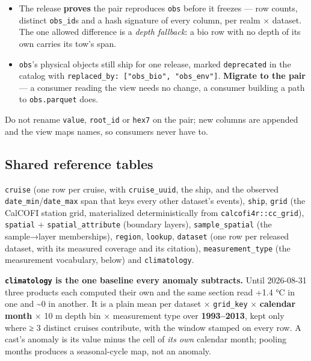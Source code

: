 \documentclass[
  letterpaper,
  DIV=11,
  numbers=noendperiod]{scrreprt}
\providecommand{\tightlist}{%
  \setlength{\itemsep}{0pt}\setlength{\parskip}{0pt}}
\begin{document}
\begin{itemize}
\tightlist
\item
  The release \textbf{proves} the pair reproduces \texttt{obs} before it
  freezes --- row counts, distinct \texttt{obs\_id}s and a hash
  signature of every column, per realm × dataset. The one allowed
  difference is a \emph{depth fallback}: a bio row with no depth of its
  own carries its tow's span.
\item
  \texttt{obs}'s physical objects still ship for one release, marked
  \texttt{deprecated} in the catalog with
  \texttt{replaced\_by:\ {[}"obs\_bio",\ "obs\_env"{]}}. \textbf{Migrate
  to the pair} --- a consumer reading the view needs no change, a
  consumer building a path to \texttt{obs.parquet} does.
\end{itemize}

Do not rename \texttt{value}, \texttt{root\_id} or \texttt{hex7} on the
pair; new columns are appended and the view maps names, so consumers
never have to.

\subsection{Shared reference tables}\label{shared-reference-tables}

\texttt{cruise} (one row per cruise, with \texttt{cruise\_uuid}, the
ship, and the observed \texttt{date\_min}/\texttt{date\_max} span that
keys every other dataset's events), \texttt{ship}, \texttt{grid} (the
CalCOFI station grid, materialized deterministically from
\texttt{calcofi4r::cc\_grid}), \texttt{spatial} +
\texttt{spatial\_attribute} (boundary layers), \texttt{sample\_spatial}
(the sample→layer memberships), \texttt{region}, \texttt{lookup},
\texttt{dataset} (one row per released dataset, with its measured
coverage and its citation), \texttt{measurement\_type} (the measurement
vocabulary, below) and \texttt{climatology}.

\textbf{\texttt{climatology} is the one baseline every anomaly
subtracts.} Until 2026-08-31 three products each computed their own and
the same section read +1.4 °C in one and \textasciitilde0 in another. It
is a plain mean per dataset × \texttt{grid\_key} × \textbf{calendar
month} × 10 m depth bin × measurement type over \textbf{1993--2013},
kept only where ≥ 3 distinct cruises contribute, with the window stamped
on every row. A cast's anomaly is its value minus the cell of \emph{its
own} calendar month; pooling months produces a seasonal-cycle map, not
an anomaly.
\end{document}
